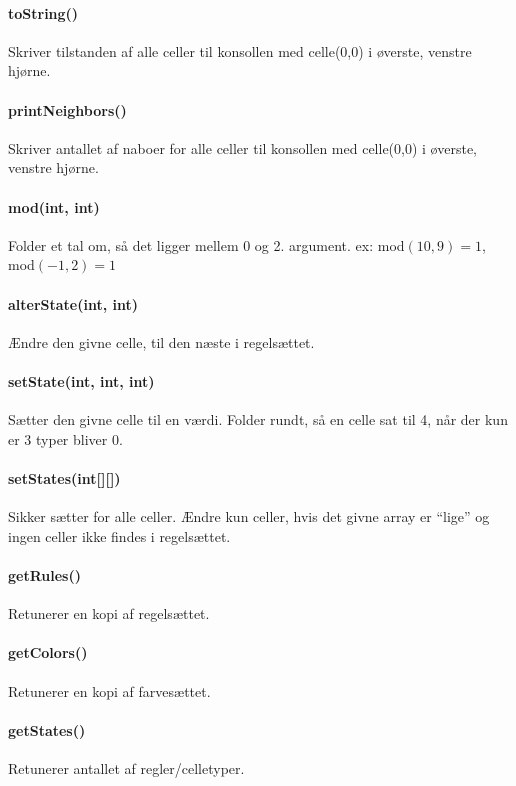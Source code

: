 \paragraph{toString()} Skriver tilstanden af alle celler til konsollen med celle(0,0) i øverste, venstre hjørne.

\paragraph{printNeighbors()} Skriver antallet af naboer for alle celler til konsollen med celle(0,0) i øverste, venstre hjørne.

\paragraph{mod(int, int)} Folder et tal om, så det ligger mellem 0 og 2. argument. ex: mod$(10, 9) = 1$, mod$(-1, 2) = 1$

\paragraph{alterState(int, int)} Ændre den givne celle, til den næste i regelsættet.

\paragraph{setState(int, int, int)} Sætter den givne celle til en værdi. Folder rundt, så en celle sat til 4, når der kun er 3 typer bliver 0.

\paragraph{setStates(int[][])} Sikker sætter for alle celler. Ændre kun celler, hvis det givne array er ``lige'' og ingen celler ikke findes i regelsættet.

\paragraph{getRules()} Retunerer en kopi af regelsættet.

\paragraph{getColors()} Retunerer en kopi af farvesættet.

\paragraph{getStates()} Retunerer antallet af regler/celletyper.


